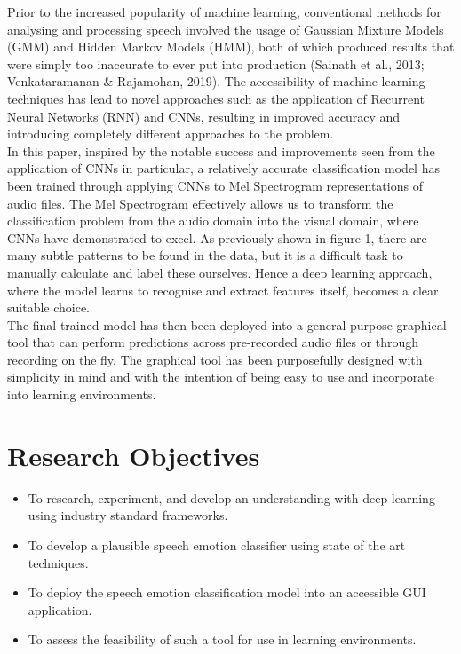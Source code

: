 \documentclass[12pt]{article}
\begin{document}
\newpage

\noindent Prior to the increased popularity of machine learning, conventional methods for analysing and processing speech involved the usage of Gaussian Mixture Models (GMM) and Hidden Markov Models (HMM), both of which produced results that were simply too inaccurate to ever put into production (Sainath et al., 2013; Venkataramanan \& Rajamohan, 2019). The accessibility of machine learning techniques has lead to novel approaches such as the application of Recurrent Neural Networks (RNN) and CNNs, resulting in improved accuracy and introducing completely different approaches to the problem.
\\

\noindent In this paper, inspired by the notable success and improvements seen from the application of CNNs in particular, a relatively accurate classification model has been trained through applying CNNs to Mel Spectrogram representations of audio files. The Mel Spectrogram effectively allows us to transform the classification problem from the audio domain into the visual domain, where CNNs have demonstrated to excel. As previously shown in figure 1, there are many subtle patterns to be found in the data, but it is a difficult task to manually calculate and label these ourselves. Hence a deep learning approach, where the model learns to recognise and extract features itself, becomes a clear suitable choice.
\\

\noindent The final trained model has then been deployed into a general purpose graphical tool that can perform predictions across pre-recorded audio files or through recording on the fly. The graphical tool has been purposefully designed with simplicity in mind and with the intention of being easy to use and incorporate into learning environments.
\section{Research Objectives}
\begin{itemize}
\item To research, experiment, and develop an understanding with deep learning using industry standard frameworks.
\item To develop a plausible speech emotion classifier using state of the art techniques.
\item To deploy the speech emotion classification model into an accessible GUI application.
\item To assess the feasibility of such a tool for use in learning environments.
\end{itemize}
\end{document}
